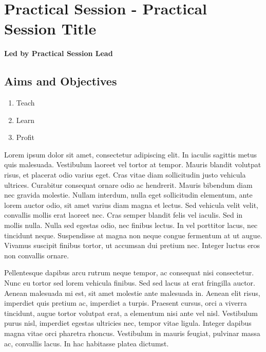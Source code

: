\documentclass[12pt,]{book}
\providecommand{\tightlist}{%
  \setlength{\itemsep}{0pt}\setlength{\parskip}{0pt}}
\begin{document}
\section*{Practical Session - Practical Session
Title}\label{practical-session---practical-session-title-2}

\textbf{Led by Practical Session Lead}

\subsection*{Aims and Objectives}\label{aims-and-objectives-6}

\begin{enumerate}
\def\labelenumi{\arabic{enumi}.}
\tightlist
\item
  Teach
\item
  Learn
\item
  Profit
\end{enumerate}

Lorem ipsum dolor sit amet, consectetur adipiscing elit. In iaculis
sagittis metus quis malesuada. Vestibulum laoreet vel tortor at tempor.
Mauris blandit volutpat risus, et placerat odio varius eget. Cras vitae
diam sollicitudin justo vehicula ultrices. Curabitur consequat ornare
odio ac hendrerit. Mauris bibendum diam nec gravida molestie. Nullam
interdum, nulla eget sollicitudin elementum, ante lorem auctor odio, sit
amet varius diam magna et lectus. Sed vehicula velit velit, convallis
mollis erat laoreet nec. Cras semper blandit felis vel iaculis. Sed in
mollis nulla. Nulla sed egestas odio, nec finibus lectus. In vel
porttitor lacus, nec tincidunt neque. Suspendisse at magna non neque
congue fermentum at ut augue. Vivamus suscipit finibus tortor, ut
accumsan dui pretium nec. Integer luctus eros non convallis ornare.

Pellentesque dapibus arcu rutrum neque tempor, ac consequat nisi
consectetur. Nunc eu tortor sed lorem vehicula finibus. Sed sed lacus at
erat fringilla auctor. Aenean malesuada mi est, sit amet molestie ante
malesuada in. Aenean elit risus, imperdiet quis pretium ac, imperdiet a
turpis. Praesent cursus, orci a viverra tincidunt, augue tortor volutpat
erat, a elementum nisi ante vel nisl. Vestibulum purus nisl, imperdiet
egestas ultricies nec, tempor vitae ligula. Integer dapibus magna vitae
orci pharetra rhoncus. Vestibulum in mauris feugiat, pulvinar massa ac,
convallis lacus. In hac habitasse platea dictumst.
\end{document}
